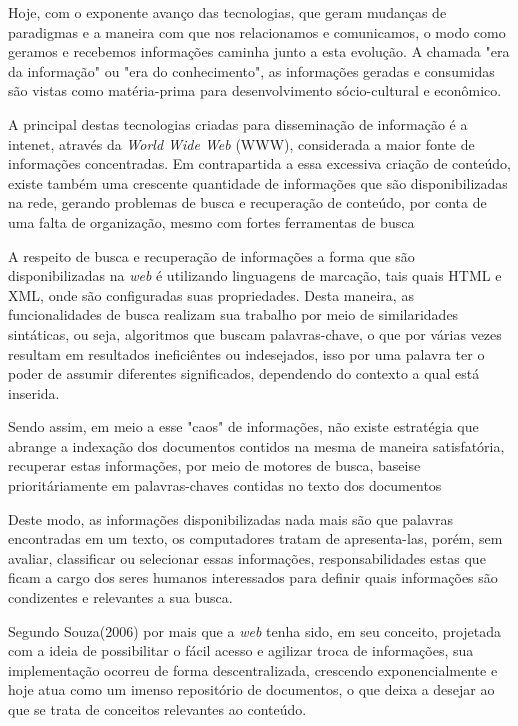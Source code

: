 Hoje, com o exponente avanço das tecnologias, que geram mudanças de paradigmas e a maneira com que nos relacionamos e comunicamos, o modo como geramos e recebemos informações caminha junto a esta evolução. A chamada "era da informação" ou "era do conhecimento", as informações geradas e consumidas são vistas como matéria-prima para
 desenvolvimento sócio-cultural e econômico.\cite{takahashi:2000}

A principal destas tecnologias criadas para disseminação de informação é a intenet, através da \textit{World Wide Web} (WWW), considerada a maior fonte de informações concentradas\cite{alves:2004}. Em contrapartida a essa excessiva criação de conteúdo, existe também uma crescente quantidade de informações que são disponibilizadas na rede, gerando problemas de busca e recuperação de conteúdo, por conta de uma falta de organização, mesmo com fortes ferramentas de busca\cite{breitman:2006}

A respeito de busca e recuperação de informações a forma que são disponibilizadas na \textit{web} é utilizando linguagens de marcação, tais quais HTML e XML, onde são configuradas suas propriedades\cite{breitman:2006}. Desta maneira, as funcionalidades de busca realizam sua trabalho por meio de similaridades sintáticas, ou seja, algoritmos que buscam palavras-chave, o que por várias vezes resultam em resultados ineficiêntes ou indesejados, isso por uma palavra ter o poder de assumir diferentes significados, dependendo do contexto a qual está inserida\cite{breitman:2006}.

Sendo assim, em meio a esse "caos" de informações, não existe estratégia que abrange a indexação dos documentos contidos na mesma de maneira satisfatória, recuperar estas informações, por meio de motores de busca, baseise prioritáriamente em palavras-chaves contidas no texto dos documentos\cite{souza:2004}

Deste modo, as informações disponibilizadas nada mais são que palavras encontradas em um texto, os computadores tratam de apresenta-las, porém, sem avaliar, classificar ou selecionar essas informações, responsabilidades estas que ficam a cargo dos seres humanos interessados para definir quais informações são condizentes e relevantes a sua busca\cite{breitman:2006}.

Segundo Souza(2006) por mais que a \textit{web} tenha sido, em seu conceito, projetada com a ideia de possibilitar o fácil acesso e agilizar troca de informações, sua implementação ocorreu de forma descentralizada, crescendo exponencialmente e hoje atua como um imenso repositório de documentos, o que deixa a desejar ao que se trata de conceitos relevantes ao conteúdo.

